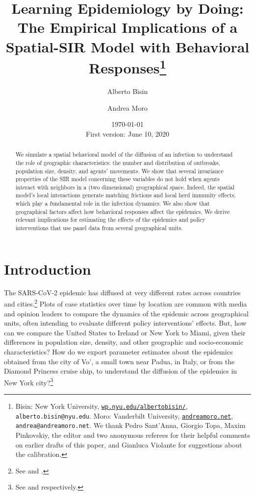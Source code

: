 \documentclass[english,11pt]{article}
\begin{document}
\setcounter{footnote}{3}
\author{
    Alberto Bisin 
    \and 
    Andrea Moro}

\title{Learning Epidemiology by Doing: \\ The Empirical Implications of a Spatial-SIR Model with Behavioral Responses\thanks{Bisin: New York University, \href{https://wp.nyu.edu/albertobisin/}{\texttt{wp.nyu.edu/albertobisin/}}, 
\texttt{alberto.bisin@nyu.edu}. Moro: Vanderbilt University, \href{https://andreamoro.net}{\texttt{andreamoro.net}}, \texttt{andrea@andreamoro.net}. We thank Pedro Sant'Anna,  Giorgio Topa,  Maxim  Pinkovskiy, the editor and two anonymous referees for their helpful
comments on earlier drafts of this paper, and Gianluca Violante for suggestions about the calibration. }
}
\date{\today \\ {\small First version: June 10, 2020}}
\maketitle
\begin{abstract}
    We simulate a spatial behavioral model of the diffusion of an infection to understand the role of geographic characteristics: the number and distribution of outbreaks, population size, density, and agents' movements.
    We show that several invariance properties of the SIR model concerning these variables do not hold when agents interact with neighbors in a (two dimensional) geographical space. Indeed, the spatial model's local interactions generate matching frictions and local herd immunity effects, which play a fundamental role in the infection dynamics. We also show that geographical factors affect how behavioral responses affect the epidemics. We derive relevant implications for estimating the effects of the epidemics and policy interventions that use panel data from several geographical units. 
\end{abstract}

\newpage


\section{Introduction}

The SARS-CoV-2 epidemic has diffused at very different rates across countries and cities.\footnote{See  \cite{Desmet2020} and  \cite{fernandez2020estimating}.} Plots of case statistics over time by location 
are common with media and opinion leaders to compare the dynamics of the epidemic across geographical units, often intending to evaluate different policy interventions' effects.  But, how can we compare the United States to Ireland or New York to Miami, given their differences in population size, density, and other geographic and socio-economic characteristics?  How do we export parameter estimates about the epidemics obtained from the city of Vo', a small town near Padua, in Italy, or from the Diamond Princess cruise ship,  to understand the diffusion of the epidemics in New York city?\footnote{See 
\cite{Lavezzo-Vo-Study} and \cite{Mizumoto_2020} 
respectively.} 
\end{document}
